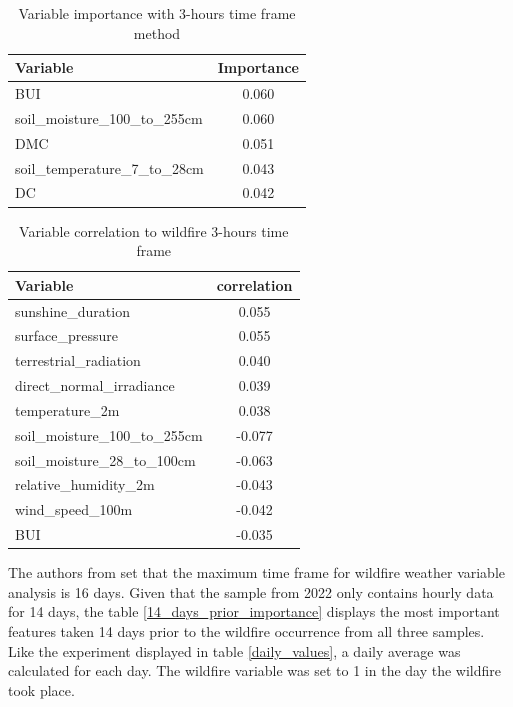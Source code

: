 \begin{table}[H]
	\centering
	\caption{Variable importance with 3-hours time frame method}
	\begin{tabular}{lc}
		\hline
		Variable                       & \multicolumn{1}{l}{Importance} \\ \hline
		BUI & 0.060                          \\
		soil\_moisture\_100\_to\_255cm                            & 0.060                          \\
		DMC                             & 0.051                          \\
		soil\_temperature\_7\_to\_28cm    & 0.043                         \\
		DC                            & 0.042                         
	\end{tabular}
	\label{hourly_importance_fwix_2015_2019_2020_3hours}
\end{table}

\begin{table}[H]
	\caption{Variable correlation to wildfire 3-hours time frame}
	\centering
	\label{hourly_correlation_fwix_2015_2019_2020_3hours}
	\begin{tabular}{lc}
		\hline
		Variable                       & \multicolumn{1}{l}{correlation} \\ \hline
		sunshine\_duration                             & 0.055                         \\
		surface\_pressure                            & 0.055                          \\
		terrestrial\_radiation & 0.040                          \\
		direct\_normal\_irradiance                            & 0.039                          \\
		temperature\_2m              & 0.038   \\
		soil\_moisture\_100\_to\_255cm & -0.077 \\
		soil\_moisture\_28\_to\_100cm & -0.063 \\
		relative\_humidity\_2m & -0.043 \\
		wind\_speed\_100m & -0.042 \\
		BUI & -0.035 \\                   
	\end{tabular}
\end{table}


The authors from \cite{wang2023improving} set that the maximum time frame for wildfire weather variable analysis is 16 days. Given that the sample from 2022 only contains hourly data for 14 days, the table \ref{14_days_prior_importance} displays the most important features taken 14 days prior to the wildfire occurrence from all three samples. Like the experiment displayed in table \ref{daily_values}, a daily average was calculated for each day. The wildfire variable was set to 1 in the day the wildfire took place. 

